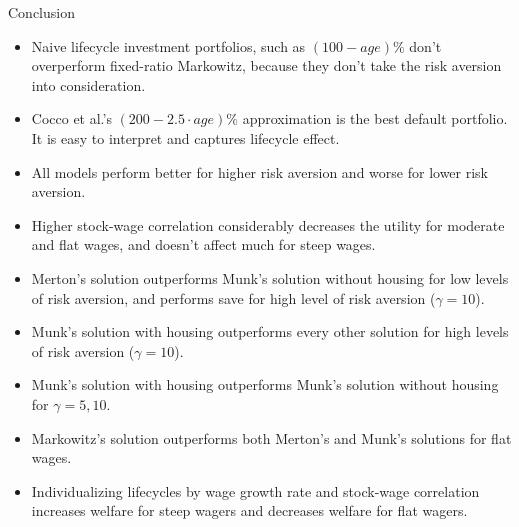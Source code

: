 \documentclass{beamer}
\begin{document}
\begin{frame}[allowframebreaks]{Conclusion}
  \begin{itemize}

\item Naive lifecycle investment portfolios, such as $(100-age)\%$ don't overperform fixed-ratio Markowitz, because they don't take the risk aversion into consideration.
\item Cocco et al.'s $(200-2.5\cdot age)\%$ approximation is the best default portfolio. It is easy to interpret and captures lifecycle effect.
\item All models perform better for higher risk aversion and worse for lower risk aversion.
\item Higher stock-wage correlation considerably decreases the utility for moderate and flat wages, and doesn't affect much for steep wages.
\item Merton's solution outperforms Munk's solution without housing for low levels of risk aversion, and performs save for high level of risk aversion ($\gamma=10$).
\item Munk's solution with housing outperforms every other solution for high levels of risk aversion ($\gamma=10$).
\item Munk's solution with housing outperforms Munk's solution without housing for $\gamma=5,10$.
\item Markowitz's solution outperforms both Merton's and Munk's solutions for flat wages.
\item Individualizing lifecycles by wage growth rate and stock-wage correlation increases welfare for steep wagers and decreases welfare for flat wagers.
  \end{itemize}
\end{frame}
\end{document}
